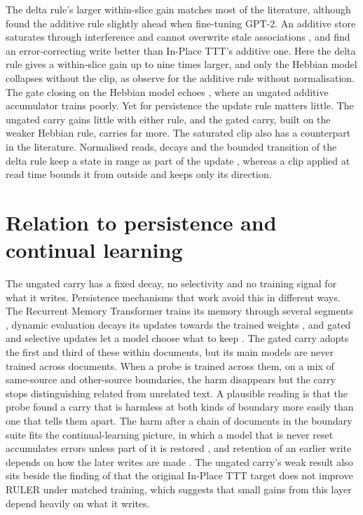 \documentclass[12pt,a4paper]{report}
\begin{document}
The delta rule's larger within-slice gain matches most of the literature, although \citet{mao2022finetuning} found the additive rule slightly ahead when fine-tuning GPT-2. An additive store saturates through interference and cannot overwrite stale associations \citep{schlag2021linear,yang2024deltanet}, and \citet{wang2026learning} find an error-correcting write better than In-Place TTT's additive one. Here the delta rule gives a within-slice gain up to nine times larger, and only the Hebbian model collapses without the clip, as \citet{schlag2021linear} observe for the additive rule without normalisation. The gate closing on the Hebbian model echoes \citet{yang2024gla}, where an ungated additive accumulator trains poorly. Yet for persistence the update rule matters little. The ungated carry gains little with either rule, and the gated carry, built on the weaker Hebbian rule, carries far more. The saturated clip also has a counterpart in the literature. Normalised reads, decays and the bounded transition of the delta rule keep a state in range as part of the update \citep{katharopoulos2020transformers,yang2024gla,yang2024deltanet}, whereas a clip applied at read time bounds it from outside and keeps only its direction.

\section{Relation to persistence and continual learning}

The ungated carry has a fixed decay, no selectivity and no training signal for what it writes. Persistence mechanisms that work avoid this in different ways. The Recurrent Memory Transformer trains its memory through several segments \citep{bulatov2022rmt}, dynamic evaluation decays its updates towards the trained weights \citep{krause2018dynamic}, and gated and selective updates let a model choose what to keep \citep{gu2024mamba,yang2025gated}. The gated carry adopts the first and third of these within documents, but its main models are never trained across documents. When a probe is trained across them, on a mix of same-source and other-source boundaries, the harm disappears but the carry stops distinguishing related from unrelated text. A plausible reading is that the probe found a carry that is harmless at both kinds of boundary more easily than one that tells them apart. The harm after a chain of documents in the boundary suite fits the continual-learning picture, in which a model that is never reset accumulates errors unless part of it is restored \citep{maharana2026continual}, and retention of an earlier write depends on how the later writes are made \citep{oneill2026continually}. The ungated carry's weak result also sits beside the finding of \citet{ouyang2026ttt} that the original In-Place TTT target does not improve RULER under matched training, which suggests that small gains from this layer depend heavily on what it writes.
\end{document}
